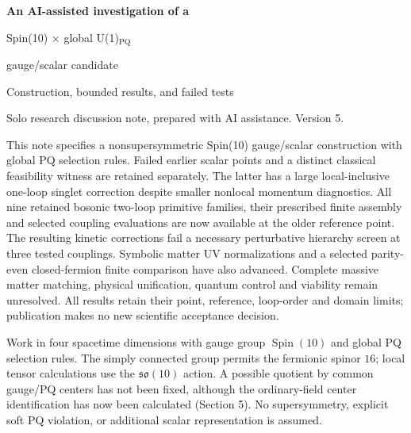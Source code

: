 \documentclass[10pt,letterpaper]{article}
\newcommand{\PQ}{\mathrm{PQ}}
\newcommand{\Spin}{\operatorname{Spin}}
\newcommand{\sect}[1]{\vspace{5pt}{\large\bfseries\color{ink}#1}\par}
\begin{document}
\thispagestyle{draft}
{\LARGE\bfseries\color{ink} An AI-assisted investigation of a\par
Spin(10) $\times$ global U(1)$_{\PQ}$\par
gauge/scalar candidate\par}
\vspace{4pt}
{\large Construction, bounded results, and failed tests}\par
{\small Solo research discussion note, prepared with AI assistance. Version 5.}

\sect{Abstract}
This note specifies a nonsupersymmetric Spin(10) gauge/scalar construction
with global PQ selection rules. Failed earlier scalar points and a distinct
classical feasibility witness are retained separately. The latter has a
large local-inclusive one-loop singlet correction despite smaller nonlocal
momentum diagnostics. All nine retained bosonic two-loop primitive families,
their prescribed finite assembly and selected coupling evaluations are now
available at the older reference point. The resulting kinetic corrections
fail a necessary perturbative hierarchy screen at three tested couplings.
Symbolic matter UV normalizations and a selected parity-even closed-fermion
finite comparison have also advanced. Complete massive matter matching,
physical unification, quantum control and viability remain unresolved.
All results retain their point, reference, loop-order and domain limits;
publication makes no new scientific acceptance decision.

\sect{1. Assumptions and fields}
Work in four spacetime dimensions with gauge group $\Spin(10)$ and global PQ
selection rules. The simply connected group permits the fermionic spinor $16$;
local tensor calculations use the $\mathfrak{so}(10)$ action. A possible quotient
by common gauge/PQ centers has not been fixed, although the ordinary-field
center identification has now been calculated (Section 5). No supersymmetry, explicit soft
PQ violation, or additional scalar representation is assumed.
\end{document}
